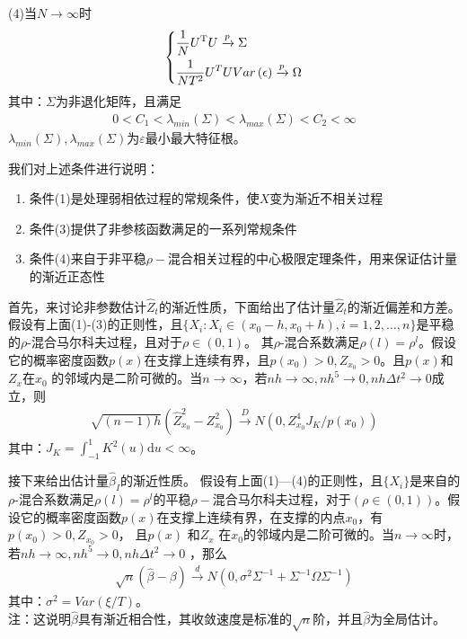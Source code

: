 		(4)当$N\rightarrow\infty$时
				\begin{equation*}
				\centering
					\left\{\begin{lgathered}
					{\frac{1}{N}{U^\mathrm{T}}U \xrightarrow{p} \Sigma }\\
					{\frac{1}{{N{T^2}}}{U^T}UVar\left(  \epsilon  \right)\xrightarrow{p} \Omega }
					\end{lgathered} \right.
				\end{equation*}
		其中：$\Sigma$为非退化矩阵，且满足
		\begin{align*}
		0<C_1<\lambda_{min}(\Sigma)<\lambda_{max}(\Sigma)<C_2<\infty\end{align*}
		$\lambda_{min}(\Sigma),\lambda_{max}(\Sigma)$为$\varepsilon$最小最大特征根。
		\par
		我们对上述条件进行说明：
		\begin{enumerate}
		  \item 条件(1)是处理弱相依过程的常规条件，使$X$变为渐近不相关过程
		  \item 条件(3)提供了非参核函数满足的一系列常规条件
		  \item 条件(4)来自于非平稳$\rho-$混合相关过程的\textcolor[rgb]{1.00,0.00,0.00}{中心极限}定理条件，用来保证估计量的渐近正态性
		\end{enumerate}
		\par
		首先，来讨论非参数估计${{\hat Z}_t}$的渐近性质，下面给出了估计量$\hat Z_{t}$的渐近偏差和方差。假设有上面(1)-(3)的正则性，且$\{ X_i:X_i \in (x_0-h,x_0+h),i=1,2,\ldots,n\}$是平稳的$\rho$-混合马尔科夫过程，且对于$\rho \in (0,1)$。 其$\rho$-混合系数满足$\rho(l)=\rho^l$。假设它的概率密度函数$p(x)$在支撑上连续有界，且$p(x_0)>0,Z_{x_0}>0$。且$p(x)$和$Z_x$在$x_0$ 的邻域内是二阶可微的。当$n\rightarrow\infty$，若$nh \rightarrow \infty,nh^5\rightarrow 0,nh \Delta t^2\rightarrow 0$成立，则
		\begin{align*}
		\sqrt {\left( {n - 1} \right)h} \left( {\hat Z_{{x_0}}^2 - Z_{{x_0}}^2} \right)\xrightarrow{D} N\left(0,Z_{x_0}^4J_K / p(x_0)\right)
		\end{align*}
		其中：$J_K=\int_{ - 1}^1 {{K^2}\left( u \right)\mathrm{d}u < \infty } $。
		\par
		接下来给出估计量${{\hat \beta }_I}$的渐近性质。
		假设有上面(1)—(4)的正则性，且$\{ X_i\}$是来自的$\rho$-混合系数满足$\rho(l)=\rho^l$的平稳$\rho-$混合马尔科夫过程，对于$(\rho \in(0,1))$。假设它的概率密度函数$p(x)$在支撑上连续有界，在支撑的内点$x_0$，有$p(x_0)>0,Z_{x_0}>0$， 且$p(x)$ 和$Z_x$ 在$x_0$的邻域内是二阶可微的。当$n\rightarrow\infty$时，若$nh\rightarrow\infty,nh^5\rightarrow 0,nh \Delta t^2\rightarrow 0$ ，那么
		\begin{align*}
		\sqrt n \left( {\hat \beta  - \beta } \right)\xrightarrow{d} N\left( {0,{\sigma ^2}{\Sigma ^{ - 1}} + {\Sigma^{ - 1}}\Omega {\Sigma ^{ - 1}}} \right)\end{align*}
		其中：${{\sigma ^2} = Var\left( \xi / T\right)}$。\\
		注：这说明$\hat{\beta}$具有渐近相合性，其收敛速度是标准的$\sqrt{n}$阶，并且$\hat{\beta}$为全局估计。

